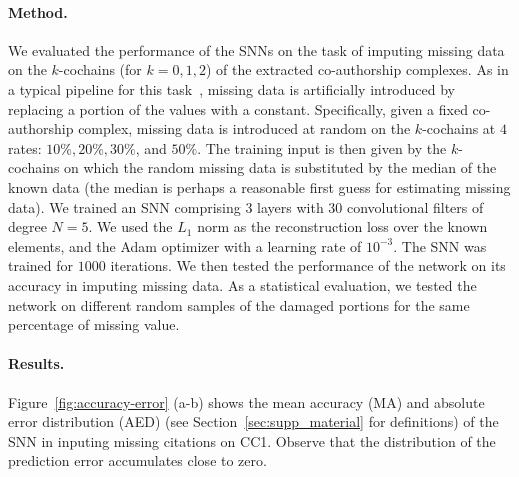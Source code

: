 \paragraph{Method.}
We evaluated the performance of the SNNs on the task of imputing missing data on the $k$-cochains (for $k=0,1,2$) of the extracted co-authorship complexes. As in a typical pipeline for this task~\cite{nelwamondo2007missing}, missing data is artificially introduced by replacing a portion of the values with a constant. Specifically, given a fixed co-authorship complex, missing data is introduced at random on the $k$-cochains at $4$ rates: $10\%,  20\%,  30\%$, and $50\%$. The training input is then given by the $k$-cochains on which the random missing data is substituted by the median of the known data (the median is perhaps a reasonable first guess for estimating missing data). We trained an SNN comprising $3$ layers with $30$ convolutional filters of degree $N=5$. We used the $L_1$ norm as the reconstruction loss over the known elements, and the Adam optimizer with a learning rate of $10^{-3}$. The SNN was trained for $1000$ iterations. We then tested the performance of the network on its accuracy in imputing missing data. As a statistical evaluation, we tested the network on different random samples of the damaged portions for the same percentage of missing value.

\paragraph{Results.}
Figure~\ref{fig:accuracy-error} (a-b) shows the mean accuracy (MA) and absolute error distribution (AED) (see Section~\ref{sec:supp_material} for definitions) of the SNN in inputing missing citations on CC1. Observe that the distribution of the prediction error accumulates close to zero.

